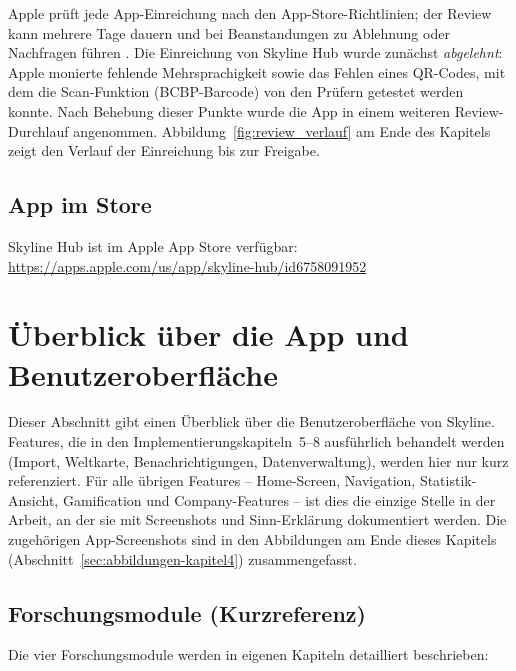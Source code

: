 Apple prüft jede App-Einreichung nach den App-Store-Richtlinien; der Review kann
mehrere Tage dauern und bei Beanstandungen zu Ablehnung oder Nachfragen führen
\cite{appleAppReview}. Die Einreichung von Skyline Hub wurde zunächst
\emph{abgelehnt}: Apple monierte fehlende Mehrsprachigkeit sowie das Fehlen eines
QR-Codes, mit dem die Scan-Funktion (BCBP-Barcode) von den Prüfern getestet werden
konnte. Nach Behebung dieser Punkte wurde die App in einem weiteren Review-Durchlauf
angenommen. Abbildung~\ref{fig:review_verlauf} am Ende des Kapitels zeigt den Verlauf der Einreichung
bis zur Freigabe.

\subsection{App im Store}

Skyline Hub ist im Apple App Store verfügbar:
\url{https://apps.apple.com/us/app/skyline-hub/id6758091952}

\section{Überblick über die App und Benutzeroberfläche}\label{sec:app-overview}

Dieser Abschnitt gibt einen Überblick über die Benutzeroberfläche von Skyline.
Features, die in den Implementierungskapiteln~5--8 ausführlich behandelt werden
(Import, Weltkarte, Benachrichtigungen, Datenverwaltung), werden hier nur kurz
referenziert. Für alle übrigen Features -- Home-Screen, Navigation, Statistik-Ansicht,
Gamification und Company-Features -- ist dies die einzige Stelle in der Arbeit, an der
sie mit Screenshots und Sinn-Erklärung dokumentiert werden. Die zugehörigen App-Screenshots sind in den Abbildungen am Ende dieses Kapitels (Abschnitt~\ref{sec:abbildungen-kapitel4}) zusammengefasst.

\subsection{Forschungsmodule (Kurzreferenz)}

Die vier Forschungsmodule werden in eigenen Kapiteln detailliert beschrieben:

